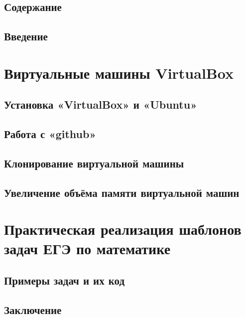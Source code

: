\documentclass[oneside,final,12pt]{extarticle} %
\begin{document}


\setcounter{page}{2}

\section*{Содержание}

\newpage

\section*{Введение}

\newpage

\chapter{Виртуальные машины VirtualBox}
\section{Установка «VirtualBox» и «Ubuntu»}



\newpage
\section{Работа с «github»}

\newpage

\section{Клонирование виртуальной машины}

\newpage

\section{Увеличение объёма памяти виртуальной машин}

\newpage

\chapter{Практическая реализация шаблонов задач ЕГЭ по математике}
\section*{Примеры задач и их код}

\newpage


\section*{Заключение}
\newpage

\begin{thebibliography}[]

\end{thebibliography}
\newpage
\appendix
\end{document}
